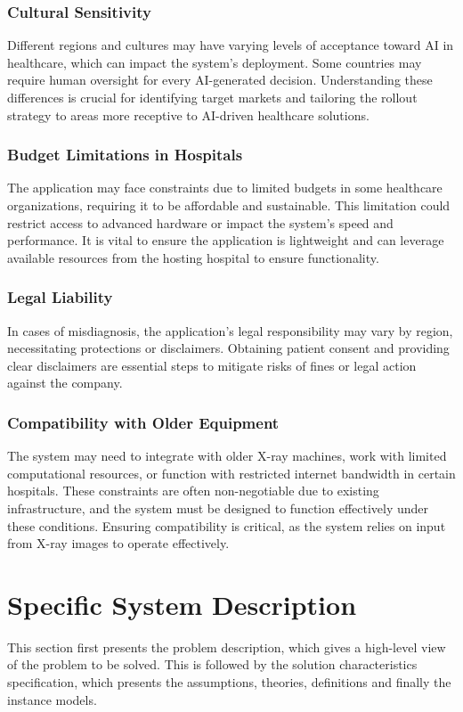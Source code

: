 \documentclass[12pt]{article}
\begin{document}
\subsubsection{Cultural Sensitivity}
Different regions and cultures may have varying levels of acceptance toward AI in healthcare, which can impact the system's deployment. Some countries may require human oversight for every AI-generated decision. Understanding these differences is crucial for identifying target markets and tailoring the rollout strategy to areas more receptive to AI-driven healthcare solutions.

\subsubsection{Budget Limitations in Hospitals}
The application may face constraints due to limited budgets in some healthcare organizations, requiring it to be affordable and sustainable. This limitation could restrict access to advanced hardware or impact the system's speed and performance. It is vital to ensure the application is lightweight and can leverage available resources from the hosting hospital to ensure functionality.

\subsubsection{Legal Liability}
In cases of misdiagnosis, the application's legal responsibility may vary by region, necessitating protections or disclaimers. Obtaining patient consent and providing clear disclaimers are essential steps to mitigate risks of fines or legal action against the company.

\subsubsection{Compatibility with Older Equipment}
The system may need to integrate with older X-ray machines, work with limited computational resources, or function with restricted internet bandwidth in certain hospitals. These constraints are often non-negotiable due to existing infrastructure, and the system must be designed to function effectively under these conditions. Ensuring compatibility is critical, as the system relies on input from X-ray images to operate effectively.


\section{Specific System Description}
This section first presents the problem description, which gives a high-level
view of the problem to be solved.  This is followed by the solution characteristics
specification, which presents the assumptions, theories, definitions and finally
the instance models.
\end{document}
